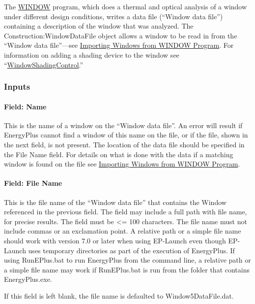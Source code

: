 The \href{https://windows.lbl.gov/software-tools#window-heading}{WINDOW} program, which does a thermal and optical analysis of a window under different design conditions, writes a data file (``Window data file'') containing a description of the window that was analyzed. The Construction:WindowDataFile object allows a window to be read in from the ``Window data file''---see \hyperref[importing-windows-from-window-program]{Importing Windows from WINDOW Program}. For information on adding a shading device to the window see ``\hyperref[windowpropertyshadingcontrol]{WindowShadingControl}.''

\subsubsection{Inputs}\label{inputs-42}

\paragraph{Field: Name}\label{field-name-36}

This is the name of a window on the ``Window data file''. An error will result if EnergyPlus cannot find a window of this name on the file, or if the file, shown in the next field, is not present. The location of the data file should be specified in the File Name field. For details on what is done with the data if a matching window is found on the file see \hyperref[importing-windows-from-window-program]{Importing Windows from WINDOW Program}.

\paragraph{Field: File Name}\label{field-file-name-000}

This is the file name of the ``Window data file'' that contains the Window referenced in the previous field. The field may include a full path with file name, for precise results. The field must be \textless{}= 100 characters. The file name must not include commas or an exclamation point. A relative path or a simple file name should work with version 7.0 or later when using EP-Launch even though EP-Launch uses temporary directories as part of the execution of EnergyPlus. If using RunEPlus.bat to run EnergyPlus from the command line, a relative path or a simple file name may work if RunEPlus.bat is run from the folder that contains EnergyPlus.exe.

If this field is left blank, the file name is defaulted to Window5DataFile.dat.

